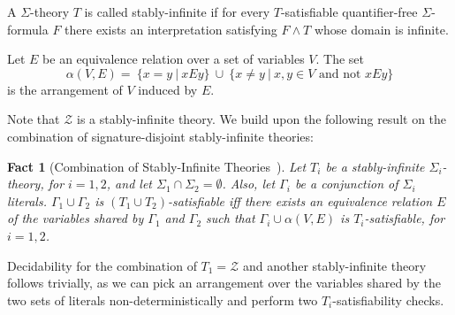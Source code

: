 \documentclass{llncs}
\newcommand{\Z}[0]{\ensuremath{\mathcal{Z}}}
\newcommand{\set}[2]{\ensuremath{\{#1\ |\ #2\}}}
\newtheorem{fact}{Fact}
\begin{document}
\begin{definition}
  A $\Sigma$-theory $T$ is called stably-infinite if for every
   $T$-satisfiable quantifier-free $\Sigma$-formula $F$ there exists an
   interpretation satisfying $F \wedge T$ whose domain is infinite.
 \end{definition}

 \begin{definition}[Arrangement]
   Let $E$ be an equivalence relation over a set of variables $V$. The
   set
   \[
     \alpha(V, E) =\ \set{x = y}{x E y}\ \cup\ \set{x \neq y}{x, y \in
       V \text{ and not } x E y}
     \]
   is the arrangement of $V$ induced by $E$.
\end{definition}

Note that $\Z$ is a stably-infinite theory. We build upon the
following result on the combination of signature-disjoint
stably-infinite theories:

\begin{fact}[Combination of Stably-Infinite
  Theories~\cite{no79,noproof,combiningdp}]
  Let $T_i$ be a stably-infinite $\Sigma_i$-theory, for $i = 1, 2$,
  and let $\Sigma_1 \cap \Sigma_2 = \emptyset$. Also, let $\Gamma_i$
  be a conjunction of $\Sigma_i$ literals. $\Gamma_1 \cup \Gamma_2$ is
  $(T_1 \cup T_2)$-satisfiable iff there exists an equivalence
  relation $E$ of the variables shared by $\Gamma_1$ and $\Gamma_2$
  such that $\Gamma_i \cup \alpha(V, E)$ is $T_i$-satisfiable, for $i
  = 1, 2$.
  \label{thm:no}
\end{fact}

Decidability for the combination of $T_1 = \Z$ and another
stably-infinite theory follows trivially, as we can pick an
arrangement over the variables shared by the two sets of literals
non-deterministically and perform two $T_i$-satisfiability checks.
\end{document}

